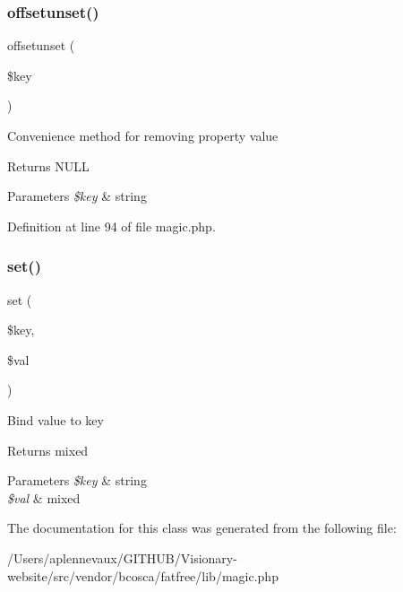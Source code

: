 \subsubsection{\texorpdfstring{offsetunset()}{offsetunset()}}
{\footnotesize\ttfamily offsetunset (\begin{DoxyParamCaption}\item[{}]{\$key }\end{DoxyParamCaption})}

Convenience method for removing property value \begin{DoxyReturn}{Returns}
N\+U\+LL 
\end{DoxyReturn}

\begin{DoxyParams}{Parameters}
{\em \$key} & string \\
\hline
\end{DoxyParams}


Definition at line 94 of file magic.\+php.

\hypertarget{class_magic_ac8d8012023e560c81f55a629022cb65a}{}\label{class_magic_ac8d8012023e560c81f55a629022cb65a} 
\subsubsection{\texorpdfstring{set()}{set()}}
{\footnotesize\ttfamily set (\begin{DoxyParamCaption}\item[{}]{\$key,  }\item[{}]{\$val }\end{DoxyParamCaption})\hspace{0.3cm}{\ttfamily [abstract]}}

Bind value to key \begin{DoxyReturn}{Returns}
mixed 
\end{DoxyReturn}

\begin{DoxyParams}{Parameters}
{\em \$key} & string \\
\hline
{\em \$val} & mixed \\
\hline
\end{DoxyParams}


The documentation for this class was generated from the following file\+:\begin{DoxyCompactItemize}
\item 
/\+Users/aplennevaux/\+G\+I\+T\+H\+U\+B/\+Visionary-\/website/src/vendor/bcosca/fatfree/lib/magic.\+php\end{DoxyCompactItemize}
